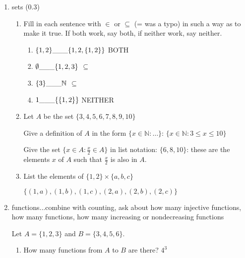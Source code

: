 \documentclass[12pt]{article}
\begin{document}
\begin{enumerate}

\item  sets (0.3)

\begin{enumerate}


\item  Fill in each sentence with $\in$ or $\subseteq$ (= was a typo)  in such a way as to make it true.  If both work, say both, if neither work, say neither.

\begin{enumerate}

\item  $\{1,2\} {\tt \_\_\_} \{1,2,\{1,2\}\}$  BOTH

\item  $\emptyset {\tt \_\_\_}  \{1,2,3\}$  $\subseteq$

\item  $\{3\}  {\tt \_\_\_}  \mathbb N$  $\subseteq$

\item  $1 {\tt \_\_\_}  \{\{1,2\}\}$  NEITHER

\end{enumerate}

\item  Let $A$ be the set $\{3,4,5,6,7,8,9,10\}$

Give a definition of $A$ in the form $\{x \in \mathbb N:\ldots\}$:  $\{x \in \mathbb N:3 \leq x \leq 10\}$

Give the set $\{x \in A:\frac x2 \in A\}$ in list notation:  $\{6,8,10\}$:  these are the elements $x$ of $A$ such that $\frac x2$ is also in $A$.

\item  List the elements of $\{1,2\} \times \{a,b,c\}$

$\{(1,a),(1,b),(1,c),(2,a),(2,b),(2,c)\}$

\end{enumerate}

\newpage

\item  functions...combine with counting, ask about how many injective functions, how many functions, how many increasing or nondecreasing functions

Let $A = \{1,2,3\}$ and $B = \{3,4,5,6\}$.

\begin{enumerate}

\item How many functions from $A$ to $B$ are there?  $4^3$


\end{enumerate}
\end{enumerate}
\end{document}
